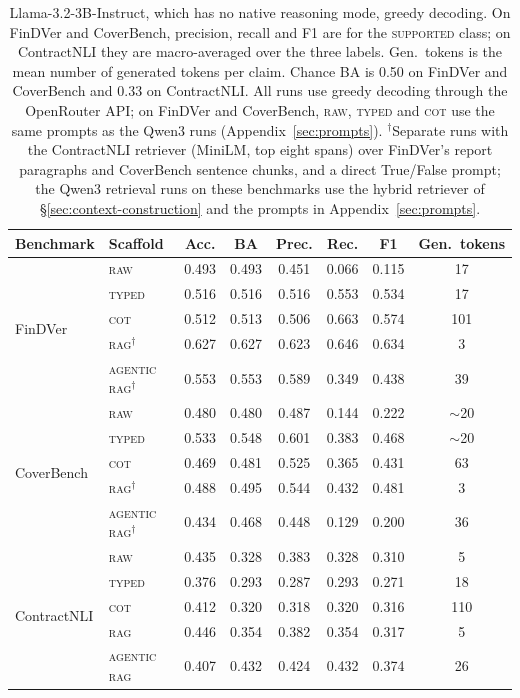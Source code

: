 \documentclass[11pt]{article}
\newcommand{\typed}{\textsc{typed}}
\begin{document}
\begin{table}[H]
\centering
\footnotesize
\setlength{\tabcolsep}{5pt}
\begin{tabular}{llcccccc}
\toprule
\textbf{Benchmark} & \textbf{Scaffold} & \textbf{Acc.} & \textbf{BA} & \textbf{Prec.} & \textbf{Rec.} & \textbf{F1} & \textbf{Gen.\ tokens} \\
\midrule
\multirow{5}{*}{FinDVer}
 & \textsc{raw}  & 0.493 & 0.493 & 0.451 & 0.066 & 0.115 & 17 \\
 & \typed{}      & 0.516 & 0.516 & 0.516 & 0.553 & 0.534 & 17 \\
 & \textsc{cot}  & 0.512 & 0.513 & 0.506 & 0.663 & 0.574 & 101 \\
 & \textsc{rag}$^{\dagger}$         & 0.627 & 0.627 & 0.623 & 0.646 & 0.634 & 3 \\
 & \textsc{agentic rag}$^{\dagger}$ & 0.553 & 0.553 & 0.589 & 0.349 & 0.438 & 39 \\
\midrule
\multirow{5}{*}{CoverBench}
 & \textsc{raw}  & 0.480 & 0.480 & 0.487 & 0.144 & 0.222 & $\sim$20 \\
 & \typed{}      & 0.533 & 0.548 & 0.601 & 0.383 & 0.468 & $\sim$20 \\
 & \textsc{cot}  & 0.469 & 0.481 & 0.525 & 0.365 & 0.431 & 63 \\
 & \textsc{rag}$^{\dagger}$         & 0.488 & 0.495 & 0.544 & 0.432 & 0.481 & 3 \\
 & \textsc{agentic rag}$^{\dagger}$ & 0.434 & 0.468 & 0.448 & 0.129 & 0.200 & 36 \\
\midrule
\multirow{5}{*}{ContractNLI}
 & \textsc{raw}          & 0.435 & 0.328 & 0.383 & 0.328 & 0.310 & 5 \\
 & \typed{}              & 0.376 & 0.293 & 0.287 & 0.293 & 0.271 & 18 \\
 & \textsc{cot}          & 0.412 & 0.320 & 0.318 & 0.320 & 0.316 & 110 \\
 & \textsc{rag}          & 0.446 & 0.354 & 0.382 & 0.354 & 0.317 & 5 \\
 & \textsc{agentic rag}  & 0.407 & 0.432 & 0.424 & 0.432 & 0.374 & 26 \\
\bottomrule
\end{tabular}
\caption{Llama-3.2-3B-Instruct, which has no native reasoning mode, greedy
decoding. On FinDVer and CoverBench, precision, recall and F1 are for the
\textsc{supported} class; on ContractNLI they are macro-averaged over the
three labels. Gen.\ tokens is the mean number of generated tokens per
claim. Chance BA is 0.50 on FinDVer and CoverBench and 0.33 on
ContractNLI. All runs use greedy decoding through the OpenRouter API; on
FinDVer and CoverBench, \textsc{raw}, \typed{} and \textsc{cot} use the same
prompts as the Qwen3 runs (Appendix~\ref{sec:prompts}).
$^{\dagger}$Separate runs with the ContractNLI retriever (MiniLM, top
eight spans) over FinDVer's report paragraphs and CoverBench sentence
chunks, and a direct True/False prompt; the Qwen3 retrieval runs on these
benchmarks use the hybrid retriever of \S\ref{sec:context-construction}
and the prompts in Appendix~\ref{sec:prompts}.}
\label{tab:llama}
\end{table}
\end{document}
